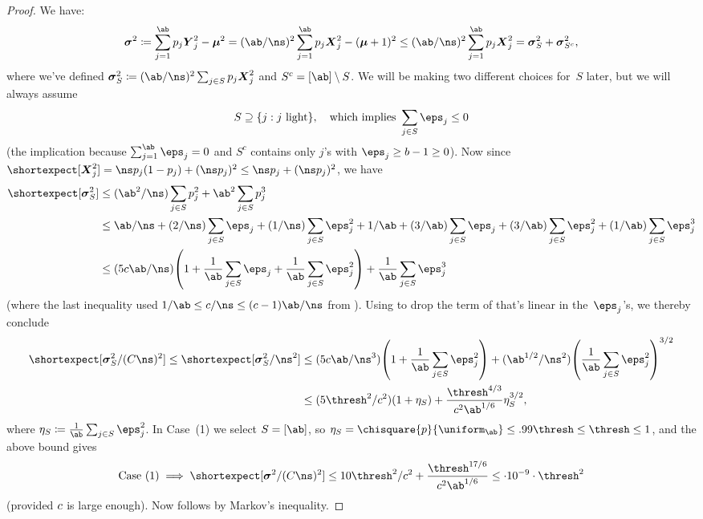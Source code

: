 \documentclass[11pt]{article}
\DeclarePairedDelimiter\parens{\lparen}{\rparen}
\newcommand{\E}{\shortexpect}
\newcommand{\bX}{\boldsymbol{X}}
\newcommand{\bY}{\boldsymbol{Y}}
\newcommand{\bmu}{\boldsymbol{\mu}}
\newcommand{\bsigma}{\boldsymbol{\sigma}}
\begin{document}
\begin{proof}
    We have:
	\begin{equation} \label{ineq:recall}
		\bsigma^2 \coloneqq \sum_{j=1}^{\ab} p_j\bY_j^2 - \bmu^2 = (\ab/\ns)^2\sum_{j=1}^{\ab} p_j\bX_j^2 - (\bmu+1)^2 \leq  (\ab/\ns)^2\sum_{j=1}^{\ab} p_j\bX_j^2 = \bsigma_S^2 + \bsigma_{S^c}^2,
	\end{equation}
	where we've defined $\bsigma_S^2 \coloneqq (\ab/\ns)^2\sum_{j \in S} p_j\bX_j^2$ and $S^c = [\ab] \setminus S$.  
	We will be making two different choices for~$S$ later, but we will always assume
	\begin{equation}	\label{ineq:neg}
		S \supseteq \{j : j \text{ light}\}, \quad \text{which implies }\sum_{j \in S} \eps_j \leq 0
	\end{equation}
	(the implication because $\sum_{j=1}^{\ab} \eps_j = 0$ and $S^c$ contains only $j$'s with $\eps_j \geq b-1 \geq 0$).
	Now since $\E[\bX_j^2] = \ns p_j(1-p_j) + (\ns p_j)^2 \leq \ns p_j + (\ns p_j)^2$, we have
	\begin{align}
		\E[\bsigma_S^2] &\leq (\ab^2/\ns)\sum_{j\in S} p_j^2 + \ab^2 \sum_{j\in S} p_j^3 \\
		&\leq \ab/\ns  +  (2/\ns)\sum_{j\in S}\eps_j + (1/\ns)\sum_{j\in S}\eps_j^2 + 1/\ab + (3/\ab) \sum_{j \in S} \eps_j +  (3/\ab) \sum_{j\in S} \eps_j^2 + (1/\ab) \sum_{j\in S} \eps_j^3 \label{ineq:just1}\\
        &\leq (5\cc\ab/\ns)\parens*{1+ \frac{1}{\ab}\sum_{j\in S}\eps_j + \frac{1}{\ab}\sum_{j\in S}\eps_j^2} + \frac{1}{\ab} \sum_{j\in S} \eps_j^3 
        \label{ineq:toreturn}
	\end{align}
	(where the last inequality used  $1/\ab \leq \cc/\ns \leq (\cc-1)\ab/\ns$ from ).
	Using  to drop the term of  that's linear in the~$\eps_j$'s, we thereby conclude
	\begin{align}
		\E[\bsigma_S^2/(\cq\ns)^2] \leq \E[\bsigma_S^2/\ns^2] 
        &\leq (5\cc\ab/\ns^3)\parens*{1 + \frac{1}{\ab}\sum_{j\in S}\eps_j^2} + (\ab^{1/2}/\ns^2) \parens*{\frac{1}{\ab}\sum_{j\in S}\eps_j^2}^{3/2}  \\
        &\leq (5\thresh^2/\cc^2)(1 + \eta_S) +  \frac{\thresh^{4/3}}{\cc^2 \ab^{1/6}} \eta_S^{3/2},
	\end{align}
	where $\eta_S \coloneqq \frac{1}{\ab}\sum_{j\in S}\eps_j^2$.
	In Case~(1) we select $S = [\ab]$, so $\eta_S = \chisquare{p}{\uniform_{\ab}} \leq .99\thresh \leq \thresh \leq 1$, and the above bound gives
	\begin{equation}
		\text{Case (1)} \implies \E[\bsigma^2/(\cq\ns)^2] \leq 10\thresh^2/\cc^2 +\frac{\thresh^{17/6}}{\cc^2 \ab^{1/6}}  \leq \cdot 10^{-9} \cdot \thresh^2
	\end{equation}
	(provided $c$ is large enough).  Now  follows by Markov's inequality.


\end{proof}
\end{document}
